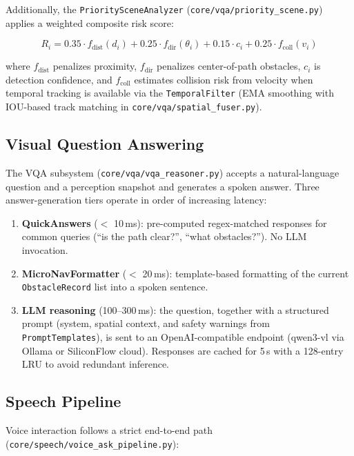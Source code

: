 Additionally, the \texttt{PrioritySceneAnalyzer} (\texttt{core/vqa/priority\_scene.py}) applies a weighted composite risk score:

\begin{equation}
R_i = 0.35 \cdot f_{\text{dist}}(d_i) + 0.25 \cdot f_{\text{dir}}(\theta_i) + 0.15 \cdot c_i + 0.25 \cdot f_{\text{coll}}(v_i)
\label{eq:risk}
\end{equation}

\noindent where $f_{\text{dist}}$ penalizes proximity, $f_{\text{dir}}$ penalizes center-of-path obstacles, $c_i$ is detection confidence, and $f_{\text{coll}}$ estimates collision risk from velocity when temporal tracking is available via the \texttt{TemporalFilter} (EMA smoothing with IOU-based track matching in \texttt{core/vqa/spatial\_fuser.py}).

\subsection{Visual Question Answering}

The VQA subsystem (\texttt{core/vqa/vqa\_reasoner.py}) accepts a natural-language question and a perception snapshot and generates a spoken answer. Three answer-generation tiers operate in order of increasing latency:

\begin{enumerate}
    \item \textbf{QuickAnswers} ($<$ 10\,ms): pre-computed regex-matched responses for common queries (``is the path clear?'', ``what obstacles?''). No LLM invocation.
    \item \textbf{MicroNavFormatter} ($<$ 20\,ms): template-based formatting of the current \texttt{ObstacleRecord} list into a spoken sentence.
    \item \textbf{LLM reasoning} (100--300\,ms): the question, together with a structured prompt (system, spatial context, and safety warnings from \texttt{PromptTemplates}), is sent to an OpenAI-compatible endpoint (qwen3-vl via Ollama or SiliconFlow cloud). Responses are cached for 5\,s with a 128-entry LRU to avoid redundant inference.
\end{enumerate}

\subsection{Speech Pipeline}

Voice interaction follows a strict end-to-end path (\texttt{core/speech/voice\_ask\_pipeline.py}):

